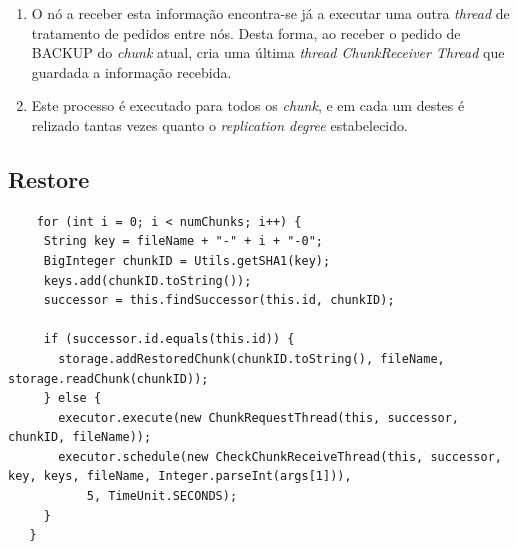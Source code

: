 \documentclass[11pt,oneside]{book}
\begin{document}
\begin{enumerate}
    \item O nó a receber esta informação encontra-se já a executar uma outra \textit{thread}
    de tratamento de pedidos entre nós. Desta forma, ao receber o pedido de BACKUP do 
    \textit{chunk} atual, cria uma última \textit{thread ChunkReceiver Thread} que guardada
    a informação recebida.

    \item Este processo é executado para todos os \textit{chunk}, e em cada um destes é relizado
    tantas vezes quanto o \textit{replication degree} estabelecido.
\end{enumerate}
    
\pagebreak

\subsection{Restore}

\begin{lstlisting}
    for (int i = 0; i < numChunks; i++) {
     String key = fileName + "-" + i + "-0";
     BigInteger chunkID = Utils.getSHA1(key);
     keys.add(chunkID.toString());
     successor = this.findSuccessor(this.id, chunkID);

     if (successor.id.equals(this.id)) {
       storage.addRestoredChunk(chunkID.toString(), fileName, storage.readChunk(chunkID));
     } else {
       executor.execute(new ChunkRequestThread(this, successor, chunkID, fileName));
       executor.schedule(new CheckChunkReceiveThread(this, successor, key, keys, fileName, Integer.parseInt(args[1])),
           5, TimeUnit.SECONDS);
     }
   }
\end{lstlisting}
\end{document}
